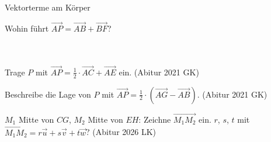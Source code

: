 \setcounter{aufgabe}{11}

\begin{aufgabe}{Vektorterme am Körper}
\begin{teile}
\teil Wohin führt $\overrightarrow{AP} = \overrightarrow{AB} + \overrightarrow{BF}$? \\  \\  \\ 

\begin{ksys3}[x1max=7]          \end{ksys3}
\teil Trage $P$ mit $\overrightarrow{AP} = \frac{1}{2} \cdot \overrightarrow{AC} + \overrightarrow{AE}$ ein. \hfill (Abitur 2021 GK)

\begin{ksys3}[x1max=7]          \end{ksys3}
\teil Beschreibe die Lage von $P$ mit $\overrightarrow{AP} = \frac{1}{2} \cdot (\overrightarrow{AG} - \overrightarrow{AB})$. \hfill (Abitur 2021 GK)

\begin{ksys3}[x1max=7]          \end{ksys3}
\teil $M_1$ Mitte von $CG$, $M_2$ Mitte von $EH$: Zeichne $\overrightarrow{M_1M_2}$ ein. $r$, $s$, $t$ mit $\overrightarrow{M_1M_2} = r\vec u + s\vec v + t\vec w$? \hfill (Abitur 2026 LK) \\


\end{teile}
\end{aufgabe}
